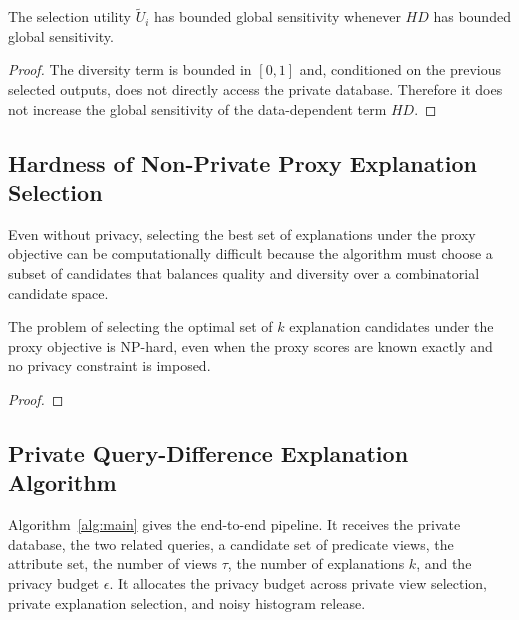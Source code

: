 \begin{proposition}
\label{prop:selection-utility-sensitivity}
The selection utility $\widetilde{U}_i$ has bounded global sensitivity whenever $HD$ has bounded global sensitivity.
\end{proposition}

\begin{proof}
The diversity term is bounded in $[0,1]$ and, conditioned on the previous selected outputs, does not directly access the private database.
Therefore it does not increase the global sensitivity of the data-dependent term $HD$.
\end{proof}

\subsection{Hardness of Non-Private Proxy Explanation Selection}
\label{subsec:non-private-hardness}

Even without privacy, selecting the best set of explanations under the proxy objective can be computationally difficult because the algorithm must choose a subset of candidates that balances quality and diversity over a combinatorial candidate space.

\begin{theorem}
\label{thm:non-private-hardness}
The problem of selecting the optimal set of $k$ explanation candidates under the proxy objective is NP-hard, even when the proxy scores are known exactly and no privacy constraint is imposed.
\end{theorem}

\begin{proof}
\end{proof}

\subsection{Private Query-Difference Explanation Algorithm}
\label{subsec:private-algorithm}

Algorithm~\ref{alg:main} gives the end-to-end pipeline.
It receives the private database, the two related queries, a candidate set of predicate views, the attribute set, the number of views $\tau$, the number of explanations $k$, and the privacy budget $\epsilon$.
It allocates the privacy budget across private view selection, private explanation selection, and noisy histogram release.

